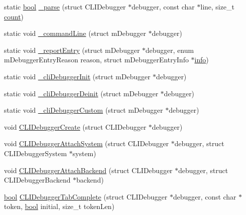 \begin{DoxyCompactItemize}
\item 
static \mbox{\hyperlink{libretro_8h_a4a26dcae73fb7e1528214a068aca317e}{bool}} \mbox{\hyperlink{debugger_2cli-debugger_8c_a0d63a2c337b6190b0b5488e84b39beb6}{\+\_\+parse}} (struct C\+L\+I\+Debugger $\ast$debugger, const char $\ast$line, size\+\_\+t \mbox{\hyperlink{enough_8c_ab25137bc309ccde185e2628bf4403ec7}{count}})
\item 
static void \mbox{\hyperlink{debugger_2cli-debugger_8c_ab978c53f9260e7091de8564374a914bb}{\+\_\+command\+Line}} (struct m\+Debugger $\ast$debugger)
\item 
static void \mbox{\hyperlink{debugger_2cli-debugger_8c_a12aa54a009f9bc0715f9a506c13a3ce8}{\+\_\+report\+Entry}} (struct m\+Debugger $\ast$debugger, enum m\+Debugger\+Entry\+Reason reason, struct m\+Debugger\+Entry\+Info $\ast$\mbox{\hyperlink{libretro_8h_a283ad41e4809f9c0ebe736a9861d8a91}{info}})
\item 
static void \mbox{\hyperlink{debugger_2cli-debugger_8c_a8fc8c3e7e849f47910d638e282575262}{\+\_\+cli\+Debugger\+Init}} (struct m\+Debugger $\ast$debugger)
\item 
static void \mbox{\hyperlink{debugger_2cli-debugger_8c_a3c33653a15d0b7731137bd69b02ce538}{\+\_\+cli\+Debugger\+Deinit}} (struct m\+Debugger $\ast$debugger)
\item 
static void \mbox{\hyperlink{debugger_2cli-debugger_8c_a510220aead524d147cc3f8877336c028}{\+\_\+cli\+Debugger\+Custom}} (struct m\+Debugger $\ast$debugger)
\item 
void \mbox{\hyperlink{debugger_2cli-debugger_8c_a26b35228e120f0d18563af7b57826e30}{C\+L\+I\+Debugger\+Create}} (struct C\+L\+I\+Debugger $\ast$debugger)
\item 
void \mbox{\hyperlink{debugger_2cli-debugger_8c_a9b5442362cea68ef05c1568aba4a0716}{C\+L\+I\+Debugger\+Attach\+System}} (struct C\+L\+I\+Debugger $\ast$debugger, struct C\+L\+I\+Debugger\+System $\ast$system)
\item 
void \mbox{\hyperlink{debugger_2cli-debugger_8c_a4fb26a94cca83e72a28abbb0136c80cc}{C\+L\+I\+Debugger\+Attach\+Backend}} (struct C\+L\+I\+Debugger $\ast$debugger, struct C\+L\+I\+Debugger\+Backend $\ast$backend)
\item 
\mbox{\hyperlink{libretro_8h_a4a26dcae73fb7e1528214a068aca317e}{bool}} \mbox{\hyperlink{debugger_2cli-debugger_8c_aa4166246fff2288dedfb505e6f5936bc}{C\+L\+I\+Debugger\+Tab\+Complete}} (struct C\+L\+I\+Debugger $\ast$debugger, const char $\ast$token, \mbox{\hyperlink{libretro_8h_a4a26dcae73fb7e1528214a068aca317e}{bool}} initial, size\+\_\+t token\+Len)
\end{DoxyCompactItemize}

